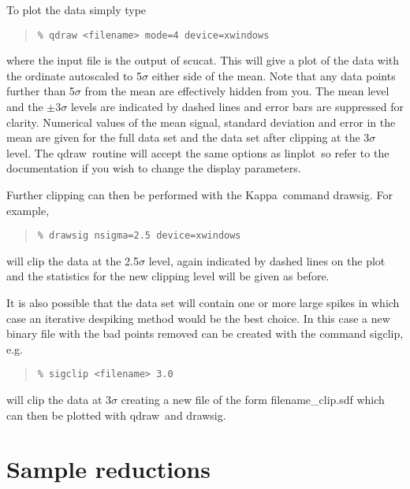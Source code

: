 \documentclass[twoside,11pt,fleqn]{article}
\newenvironment{myquote}{\begin{quote}\begin{small}}{\end{small}\end{quote}}
\newcommand{\Kappa}{\xref{{\sc Kappa}}{sun95}{}}
\newcommand{\task}[1]{{\sf #1}}
\newcommand{\scucat}{\xref{\task{scucat}}{sun216}{SCUCAT}}
\newcommand{\qdraw}{\xref{\task{qdraw}}{sun216}{QDRAW}}
\newcommand{\sigclip}{\xref{\task{sigclip}}{sun216}{SIGCLIP}}
\newcommand{\linplot}{\xref{\task{linplot}}{sun95}{LINPLOT}}
\newcommand{\drawsig}{\xref{\task{drawsig}}{sun95}{DRAWSIG}}
\newcommand{\xref}[3]{#1}
\begin{document}
To plot the data simply type

\begin{myquote}
\begin{verbatim}
% qdraw <filename> mode=4 device=xwindows
\end{verbatim}
\end{myquote}

where the input file is the output of \scucat. This will give a
plot of the data with the ordinate autoscaled to 5$\sigma$ either side
of the mean. Note that any data points further than 5$\sigma$ from the
mean are effectively hidden from you. The mean level and the
$\pm$3$\sigma$ levels are indicated by dashed lines and error bars are
suppressed for clarity. Numerical values of the mean signal, standard
deviation and error in the mean are given for the full data set and
the data set after clipping at the 3$\sigma$ level. The \qdraw\
routine will accept the same options as \linplot\ so refer to the
documentation if you wish to change the display parameters.

Further clipping can then be performed with the \Kappa\ command
\drawsig. For example,

\begin{myquote}
\begin{verbatim}
% drawsig nsigma=2.5 device=xwindows
\end{verbatim}
\end{myquote}

will clip the data at the 2.5$\sigma$ level, again indicated by
dashed lines on the plot and the statistics for the new clipping level
will be given as before.

It is also possible that the data set will contain one or more large
spikes in which case an iterative despiking method would be the best
choice. In this case a new binary file with the bad points removed can
be created with the command \sigclip, e.g.

\begin{myquote}
\begin{verbatim}
% sigclip <filename> 3.0
\end{verbatim}
\end{myquote}

will clip the data at 3$\sigma$ creating a new file of the form
filename\_clip.sdf which can then be plotted with \qdraw\ and
\drawsig.

\section{Sample reductions}
\end{document}
